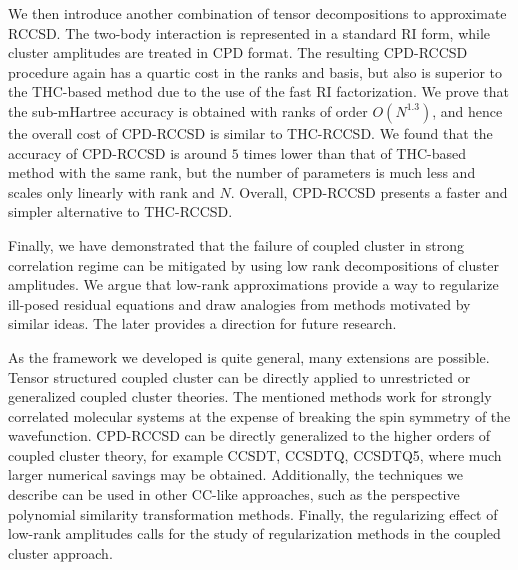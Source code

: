 We then introduce another combination of tensor decompositions to approximate 
RCCSD. The two-body interaction is represented in a standard RI form, 
while cluster amplitudes are treated in CPD format. The resulting CPD-RCCSD 
procedure again has a quartic cost in the ranks and basis, but also is superior 
to the THC-based method due to the use of the fast RI factorization. We prove 
that the sub-mHartree accuracy is obtained with ranks of order $O(N^{1.3})$, 
and hence the overall cost of CPD-RCCSD is similar to THC-RCCSD. We found that 
the accuracy of CPD-RCCSD is around $5$ times lower than that of THC-based 
method with the same rank, but the number of parameters is much less and 
scales only linearly with rank and $N$. Overall, CPD-RCCSD presents a faster and 
simpler alternative to THC-RCCSD. 

Finally, we have demonstrated that the failure of coupled cluster in strong 
correlation regime can be mitigated by using low rank decompositions of 
cluster amplitudes. We argue that low-rank approximations provide a way to 
regularize ill-posed residual equations and draw analogies from methods 
motivated by similar ideas. The later provides a direction for future 
research.

As the framework we developed is quite general, many extensions are possible. 
Tensor structured coupled cluster can be directly applied to unrestricted or 
generalized coupled cluster theories. The mentioned methods work for strongly 
correlated molecular systems at the expense of breaking the spin symmetry of 
the wavefunction. CPD-RCCSD can be directly generalized to the higher orders of 
coupled cluster theory, for example CCSDT, CCSDTQ, CCSDTQ5, where much larger 
numerical savings may be obtained. Additionally, the techniques we describe 
can be used in other CC-like approaches, such as the perspective polynomial 
similarity transformation methods.\cite{degroote2016polynomial, 
gomez2017attenuated} Finally, the regularizing effect of 
low-rank amplitudes calls for the study of regularization methods in the 
coupled cluster approach.